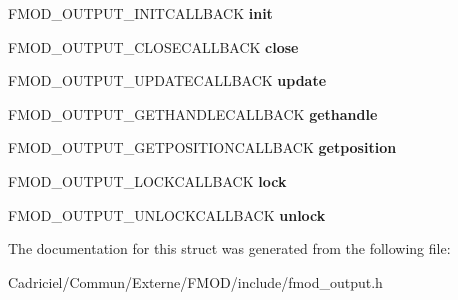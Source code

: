 \begin{DoxyCompactItemize}
\item 
F\+M\+O\+D\+\_\+\+O\+U\+T\+P\+U\+T\+\_\+\+I\+N\+I\+T\+C\+A\+L\+L\+B\+A\+CK {\bfseries init}\hypertarget{struct_f_m_o_d___o_u_t_p_u_t___d_e_s_c_r_i_p_t_i_o_n_a16015d5d334e75322b95adebaac20139}{}\label{struct_f_m_o_d___o_u_t_p_u_t___d_e_s_c_r_i_p_t_i_o_n_a16015d5d334e75322b95adebaac20139}

\item 
F\+M\+O\+D\+\_\+\+O\+U\+T\+P\+U\+T\+\_\+\+C\+L\+O\+S\+E\+C\+A\+L\+L\+B\+A\+CK {\bfseries close}\hypertarget{struct_f_m_o_d___o_u_t_p_u_t___d_e_s_c_r_i_p_t_i_o_n_a5e0e9b99b7b8011bb248e58ad82b4fa8}{}\label{struct_f_m_o_d___o_u_t_p_u_t___d_e_s_c_r_i_p_t_i_o_n_a5e0e9b99b7b8011bb248e58ad82b4fa8}

\item 
F\+M\+O\+D\+\_\+\+O\+U\+T\+P\+U\+T\+\_\+\+U\+P\+D\+A\+T\+E\+C\+A\+L\+L\+B\+A\+CK {\bfseries update}\hypertarget{struct_f_m_o_d___o_u_t_p_u_t___d_e_s_c_r_i_p_t_i_o_n_a3c61df7f0da61edd058317a0966c04bf}{}\label{struct_f_m_o_d___o_u_t_p_u_t___d_e_s_c_r_i_p_t_i_o_n_a3c61df7f0da61edd058317a0966c04bf}

\item 
F\+M\+O\+D\+\_\+\+O\+U\+T\+P\+U\+T\+\_\+\+G\+E\+T\+H\+A\+N\+D\+L\+E\+C\+A\+L\+L\+B\+A\+CK {\bfseries gethandle}\hypertarget{struct_f_m_o_d___o_u_t_p_u_t___d_e_s_c_r_i_p_t_i_o_n_a2029938a3daf763ac99e971bf0a4ce40}{}\label{struct_f_m_o_d___o_u_t_p_u_t___d_e_s_c_r_i_p_t_i_o_n_a2029938a3daf763ac99e971bf0a4ce40}

\item 
F\+M\+O\+D\+\_\+\+O\+U\+T\+P\+U\+T\+\_\+\+G\+E\+T\+P\+O\+S\+I\+T\+I\+O\+N\+C\+A\+L\+L\+B\+A\+CK {\bfseries getposition}\hypertarget{struct_f_m_o_d___o_u_t_p_u_t___d_e_s_c_r_i_p_t_i_o_n_ae8b8332e832ea9d12c45a48dd0481e9e}{}\label{struct_f_m_o_d___o_u_t_p_u_t___d_e_s_c_r_i_p_t_i_o_n_ae8b8332e832ea9d12c45a48dd0481e9e}

\item 
F\+M\+O\+D\+\_\+\+O\+U\+T\+P\+U\+T\+\_\+\+L\+O\+C\+K\+C\+A\+L\+L\+B\+A\+CK {\bfseries lock}\hypertarget{struct_f_m_o_d___o_u_t_p_u_t___d_e_s_c_r_i_p_t_i_o_n_a906c1cdb6636db105538db27b48cc513}{}\label{struct_f_m_o_d___o_u_t_p_u_t___d_e_s_c_r_i_p_t_i_o_n_a906c1cdb6636db105538db27b48cc513}

\item 
F\+M\+O\+D\+\_\+\+O\+U\+T\+P\+U\+T\+\_\+\+U\+N\+L\+O\+C\+K\+C\+A\+L\+L\+B\+A\+CK {\bfseries unlock}\hypertarget{struct_f_m_o_d___o_u_t_p_u_t___d_e_s_c_r_i_p_t_i_o_n_adeb7eea407c7b5b167d0cd30c6ef4a9f}{}\label{struct_f_m_o_d___o_u_t_p_u_t___d_e_s_c_r_i_p_t_i_o_n_adeb7eea407c7b5b167d0cd30c6ef4a9f}

\end{DoxyCompactItemize}


The documentation for this struct was generated from the following file\+:\begin{DoxyCompactItemize}
\item 
Cadriciel/\+Commun/\+Externe/\+F\+M\+O\+D/include/fmod\+\_\+output.\+h\end{DoxyCompactItemize}
